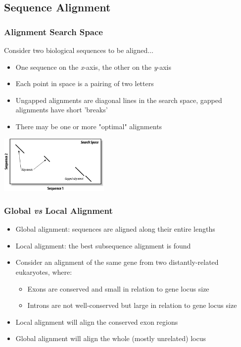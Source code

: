 %

\subsection{Sequence Alignment}
\begin{frame}
  \frametitle{Alignment Search Space}
  Consider two biological sequences to be aligned$\ldots$
  \begin{itemize}
    \item One sequence on the \textit{x}-axis, the other on the \textit{y}-axis
    \item Each point in space is a pairing of two letters
    \item Ungapped alignments are diagonal lines in the search space, gapped alignments have short 'breaks'
    \item There may be one or more "optimal" alignments
  \end{itemize}
  \begin{center}
    \includegraphics[width=0.4\textwidth]{images/search_space} 
  \end{center}
\end{frame}
    
\begin{frame}
  \frametitle{Global \textit{vs} Local Alignment}
  \begin{itemize}
    \item<1-> Global alignment: sequences are aligned along their entire lengths
    \item<1-> Local alignment: the best subsequence alignment is found
    \item<2-> Consider an alignment of the same gene from two distantly-related eukaryotes, where:
    \begin{itemize}
      \item<2-> Exons are conserved and small in relation to gene locus size
      \item<2-> Introns are not well-conserved but large in relation to gene locus size
    \end{itemize}
    \item<2-> Local alignment will align the conserved exon regions
    \item<2-> Global alignment will align the whole (mostly unrelated) locus
  \end{itemize}
 \end{frame}
